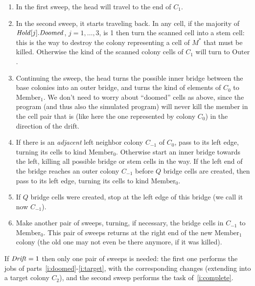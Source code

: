 \documentclass[11pt]{memoir}
\theoremstyle{definition} %
\newcommand{\fld}[1]{\ensuremath{\textit{#1\/}}}
\newcommand{\Drift}{\fld{Drift}}
\newcommand{\Doomed}{\fld{Doomed}}
\newcommand{\Hold}{\fld{Hold}}
\newcommand{\Member}{\mathrm{Member}}
\newcommand{\Outer}{\mathrm{Outer}}
\begin{document}
\begin{enumerate}
\item In the first sweep, the head will travel to the end of \( C_{1} \).
  
\item \label{i:doomed}
  In the second sweep, it starts traveling back.
  In any cell, if the majority of \( \Hold[j].\Doomed \), \( j=1,\dots,3 \),
is 1 then turn the scanned cell into a stem cell: 
this is the way to destroy the colony representing a cell of \( M^{*} \) that
must be killed.
Otherwise the kind of the scanned colony cells of \( C_{1} \) will turn to \( \Outer \).

\item\label{i:left-edge}
  Continuing the sweep, the head turns  the possible inner bridge between the
  base colonies into an outer bridge, and turns
  the kind of elements of \( C_{0} \) to \( \Member_{1} \).
  We don't need to worry about ``doomed'' cells as above, since
  the program (and thus also the simulated program) will never kill the member in the cell pair
  that is (like here the one represented by colony \( C_{0} \)) in the direction of the drift.

  \item If there is an \emph{adjacent} left neighbor colony \( C_{-1} \) of \( C_{0} \),
    pass to its left edge, turning its cells to kind \(\Member_{0} \).
    Otherwise start an inner bridge towards the left, killing all possible bridge or stem cells in the way.
    If the left end of the bridge reaches an outer colony \( C_{-1} \)
    before \( Q \) bridge cells are created, then pass to its left edge,
    turning its cells to kind \( \Member_{0} \).

  \item\label{i:target}
    If \( Q \) bridge cells were created, stop at the left edge of this bridge (we call it now \( C_{-1} \)).

  \item\label{i:complete}
    Make another pair of sweeps, turning, if necessary, the bridge cells in \( C_{-1} \) to
    \( \Member_{0} \).
    This pair of sweeps returns at the right end of the new \( \Member_{1} \) colony
    (the old one may not even be there anymore, if it was killed).
  
  \end{enumerate}

  If \( \Drift=1 \) then only one pair of sweeps is needed:
  the first one performs the jobs of parts~\ref{i:doomed}-\ref{i:target},
with the corresponding changes (extending into a target colony \( C_{2} \)), and the second sweep
performs the task of~\ref{i:complete}.
\end{document}

